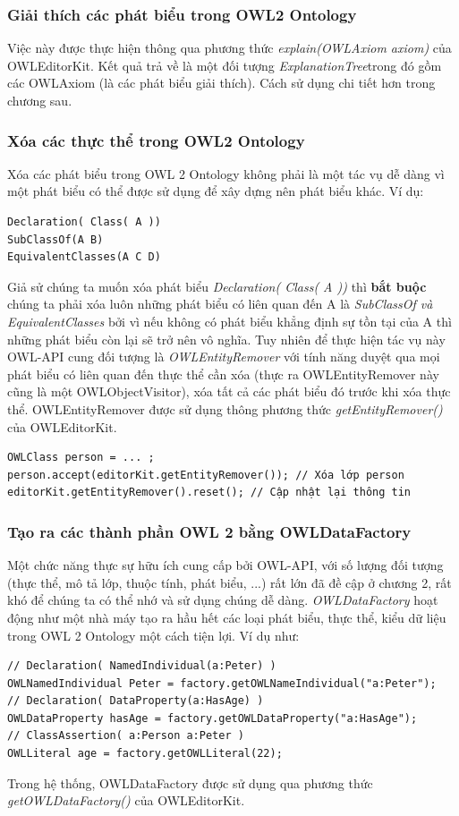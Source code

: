 {\subsubsection{Giải thích các phát biểu trong OWL2 Ontology}
Việc này được thực hiện thông qua phương thức \textit{explain(OWLAxiom axiom)} của OWLEditorKit. Kết quả trả về là một đối tượng \textit{ExplanationTree}trong đó gồm các OWLAxiom (là các phát biểu giải thích). Cách sử dụng
chi tiết hơn trong chương sau.

\subsubsection{Xóa các thực thể trong OWL2 Ontology}
Xóa các phát biểu trong OWL 2 Ontology không phải là một tác vụ dễ dàng vì một phát biểu có thể được sử dụng để xây dựng nên phát biểu khác. Ví dụ:
\begin{verbatim}
Declaration( Class( A ))
SubClassOf(A B)
EquivalentClasses(A C D)
\end{verbatim}
Giả sử chúng ta muốn xóa phát biểu \textit{Declaration( Class( A ))} thì \textbf{bắt buộc} chúng ta phải xóa luôn những phát biểu có liên quan đến A là \textit{SubClassOf và EquivalentClasses} bởi vì nếu không có phát biểu khẳng định sự tồn tại của A thì những phát biểu còn lại sẽ trở nên vô nghĩa. Tuy nhiên để thực hiện tác vụ này OWL-API cung đối tượng là \textit{OWLEntityRemover} với tính năng duyệt qua mọi phát biểu có liên quan đến thực thể cần xóa (thực ra OWLEntityRemover này cũng là một OWLObjectVisitor), xóa tất cả các phát biểu đó trước khi xóa thực thể. OWLEntityRemover được sử dụng thông phương thức \textit{getEntityRemover()} của OWLEditorKit. 
\begin{verbatim}
OWLClass person = ... ;
person.accept(editorKit.getEntityRemover()); // Xóa lớp person 
editorKit.getEntityRemover().reset(); // Cập nhật lại thông tin
\end{verbatim}

\subsubsection{Tạo ra các thành phần OWL 2 bằng OWLDataFactory}
Một chức năng thực sự hữu ích cung cấp bởi OWL-API, với số lượng đối tượng (thực thể, mô tả lớp, thuộc tính, phát biểu, ...) rất lớn đã đề cập ở chương 2, rất khó để chúng ta có thể nhớ và sử dụng chúng dễ dàng. \textit{OWLDataFactory} hoạt động như một nhà máy tạo ra hầu hết các loại phát biểu, thực thể, kiểu dữ liệu trong OWL 2 Ontology một cách tiện lợi. Ví dụ như:
\begin{verbatim}
// Declaration( NamedIndividual(a:Peter) )
OWLNamedIndividual Peter = factory.getOWLNameIndividual("a:Peter");
// Declaration( DataProperty(a:HasAge) )
OWLDataProperty hasAge = factory.getOWLDataProperty("a:HasAge");
// ClassAssertion( a:Person a:Peter )
OWLLiteral age = factory.getOWLLiteral(22);
\end{verbatim}
Trong hệ thống, OWLDataFactory được sử dụng qua phương thức \textit{getOWLDataFactory()} của OWLEditorKit.

}
